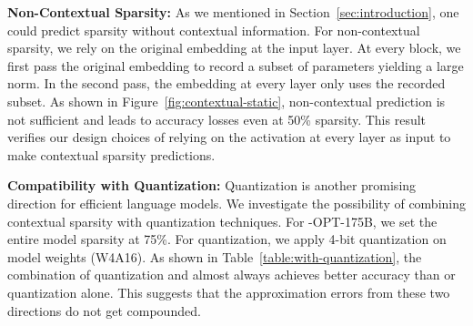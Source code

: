 \textbf{Non-Contextual Sparsity: } As we mentioned in Section~\ref{sec:introduction}, one could predict sparsity without contextual information. For non-contextual sparsity, we rely on the original embedding at the input layer. At every block, we first pass the original embedding to record a subset of parameters yielding a large norm. In the second pass, the embedding at every layer only uses the recorded subset. As shown in Figure~\ref{fig:contextual-static}, non-contextual prediction is not sufficient and leads to accuracy losses even at 50\% sparsity.  This result verifies our design choices of relying on the activation at every layer as input to make contextual sparsity predictions.

\textbf{Compatibility with Quantization:} Quantization is another promising direction for efficient language models. We investigate the possibility of combining contextual sparsity with quantization techniques. For \name{}-OPT-175B, we set the entire model sparsity at 75\%. For quantization, we apply 4-bit quantization on model weights (W4A16). As shown in Table~\ref{table:with-quantization}, the combination of quantization and \name{} almost always achieves better accuracy than \name{}  or quantization alone. This suggests that the approximation errors from these two directions do not get compounded. 
\begin{table}[t]
\vspace{-2mm}
\scriptsize
\centering
\caption{\name{}-OPT-175B with 4-bit quantization.}
\vspace{2mm}
\vspace{-3mm}
\label{table:with-quantization}
\end{table}